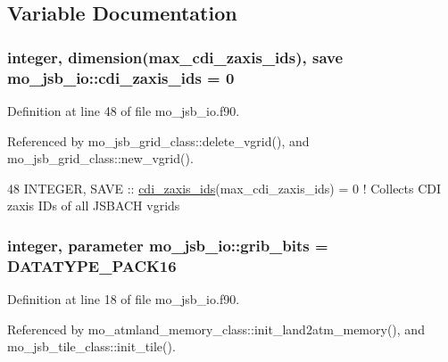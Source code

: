 \subsection{Variable Documentation}
\hypertarget{namespacemo__jsb__io_a40fcb52ae787aaf48e1497bf80759dfb}{}
\subsubsection[{cdi\+\_\+zaxis\+\_\+ids}]{\setlength{\rightskip}{0pt plus 5cm}integer, dimension({\bf max\+\_\+cdi\+\_\+zaxis\+\_\+ids}), save mo\+\_\+jsb\+\_\+io\+::cdi\+\_\+zaxis\+\_\+ids = 0}\label{namespacemo__jsb__io_a40fcb52ae787aaf48e1497bf80759dfb}


Definition at line 48 of file mo\+\_\+jsb\+\_\+io.\+f90.



Referenced by mo\+\_\+jsb\+\_\+grid\+\_\+class\+::delete\+\_\+vgrid(), and mo\+\_\+jsb\+\_\+grid\+\_\+class\+::new\+\_\+vgrid().


\begin{DoxyCode}
48   \textcolor{keywordtype}{INTEGER}, \textcolor{keywordtype}{SAVE} :: \hyperlink{namespacemo__jsb__io_a40fcb52ae787aaf48e1497bf80759dfb}{cdi\_zaxis\_ids}(max\_cdi\_zaxis\_ids) = 0  \textcolor{comment}{! Collects CDI zaxis IDs of all
       JSBACH vgrids}
\end{DoxyCode}
\hypertarget{namespacemo__jsb__io_aade09fd070010f905e77497f041ce6c3}{}
\subsubsection[{grib\+\_\+bits}]{\setlength{\rightskip}{0pt plus 5cm}integer, parameter mo\+\_\+jsb\+\_\+io\+::grib\+\_\+bits = D\+A\+T\+A\+T\+Y\+P\+E\+\_\+\+P\+A\+C\+K16}\label{namespacemo__jsb__io_aade09fd070010f905e77497f041ce6c3}


Definition at line 18 of file mo\+\_\+jsb\+\_\+io.\+f90.



Referenced by mo\+\_\+atmland\+\_\+memory\+\_\+class\+::init\+\_\+land2atm\+\_\+memory(), and mo\+\_\+jsb\+\_\+tile\+\_\+class\+::init\+\_\+tile().



